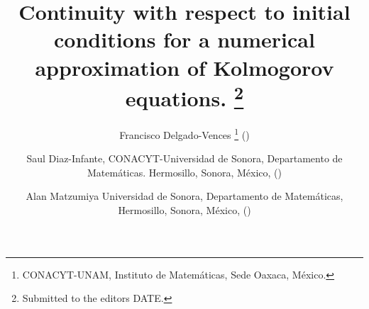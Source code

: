 \usepackage{lipsum}
\usepackage{amsfonts}
\usepackage{amsmath, amssymb}
\usepackage{graphicx}
\usepackage{epstopdf}
\usepackage{algorithmic}
\ifpdf
\else
\fi

\newcommand{\creflastconjunction}{, and~}



\title{
    Continuity with respect to initial conditions for a numerical 
    approximation of Kolmogorov equations.
    \thanks{
        Submitted to the editors DATE.
    }
}

\author{
    Francisco Delgado-Vences
    \thanks{
    CONACYT-UNAM, 
    Instituto de Matem\'aticas, 
    Sede Oaxaca, M\'exico.}
    ()
%    
    \and
    Saul Diaz-Infante,
    CONACYT-Universidad 
    de Sonora, Departamento de Matem\'aticas. 
    Hermosillo, Sonora, M\'exico,
    ()
%
    \and
    Alan Matzumiya
    Universidad de Sonora, 
    Departamento de Matem\'aticas,
    Hermosillo, Sonora, M\'exico,
    ()
    \footnotemark[3]
}

\usepackage{amsopn}
\DeclareMathOperator{\diag}{diag}

\newcommand{\cqd}{\hfill$\Box$}
\newcommand{\f}{{\mathcal F}}
\newcommand{\IR}{{\mathbb R}}
\newcommand{\R}{{\mathbb R}}
\newcommand{\IN}{{\mathbb N}}
\newcommand{\ind}{\mbox{\Large$\chi$}}
\newcommand{\tor}{{\mathbb T}}
\newcommand{\G}{{\mathbb G}}
\newcommand{\beq}{\begin{equation}}
\newcommand{\eeq}{\end{equation}}
\newcommand{\bal}{\begin{align}}
\newcommand{\eal}{\end{align}}
\newcommand{\beqn}{\begin{equation*}}
\newcommand{\eeqn}{\end{equation*}}
\newcommand{\baln}{\begin{align*}}
\newcommand{\ealn}{\end{align*}}
\newcommand{\tbar}{\bar t}
\newcommand{\xbar}{\bar x}
\newcommand{\ep}{\epsilon}
\newcommand{\Pb}{\mathbb P}
\newcommand{\Rl}{\mathbb R}
\newcommand{\E}{\mathbb{E}}
\newcommand{\tf}{\mathcal{F}}
\newcommand{\hac}{\mathcal{H}}
\newcommand{\hact}{\mathcal{H}_T}

